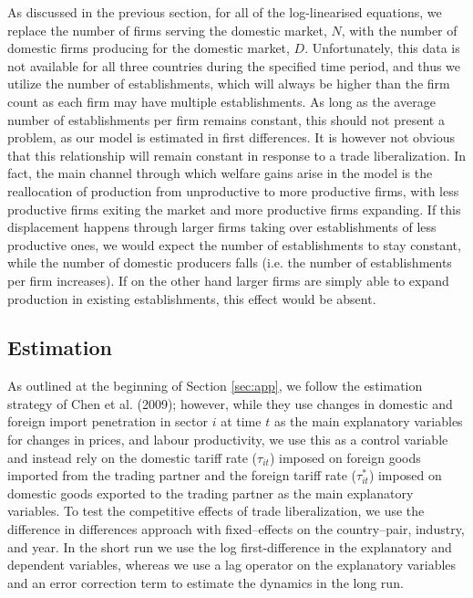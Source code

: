 As discussed in the previous section, for all of the log-linearised equations, 
we replace the number of firms serving the domestic market, $N$, with the number 
of domestic firms producing for the domestic market, $D$. Unfortunately, this 
data is not available for all three countries during the specified time period, 
and thus we utilize the number of establishments, which will always be higher 
than the firm count as each firm may have multiple establishments. As long as 
the average number of establishments per firm remains constant, this should not 
present a problem, as our model is estimated in first differences. It is however 
not obvious that this relationship will remain constant in response to a trade 
liberalization. In fact, the main channel through which welfare gains arise in 
the model is the reallocation of production from unproductive to more productive 
firms, with less productive firms exiting the market and more productive firms 
expanding. If this displacement happens through larger firms taking over 
establishments of less productive ones, we would expect the number of establishments 
to stay constant, while the number of domestic producers falls (i.e. the number 
of establishments per firm increases). If on the other hand larger firms are simply 
able to expand production in existing establishments, this effect would be absent.  


\subsection{Estimation}
As outlined at the beginning of Section \ref{sec:app}, we follow the estimation 
strategy of Chen et al. (2009); however, while they use changes in domestic and 
foreign import penetration in sector $i$ at time $t$ as the main explanatory 
variables for changes in prices, and labour productivity, we use this as
 a control variable and instead rely on the domestic tariff rate ($\tau_{it}$) 
imposed on foreign goods imported from the trading partner and the foreign tariff 
rate ($\tau_{it}^*$) imposed on domestic goods exported to the trading partner as the 
main explanatory variables. To test the competitive effects of trade liberalization, 
we use the difference in differences approach with fixed--effects on the 
country--pair, industry, and year. In the short run we use the log first-difference 
in the explanatory and dependent variables, whereas we use a lag 
operator on the explanatory variables and an error correction term to estimate the
 dynamics in the long run. 

